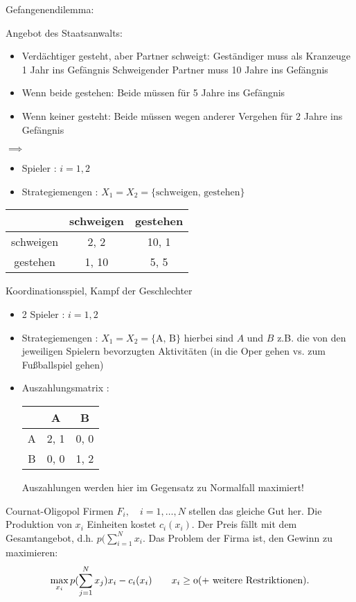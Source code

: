 \begin{beispiel}
	Gefangenendilemma:

	Angebot des Staatsanwalts:
	\begin{itemize}
		\item Verdächtiger gesteht, aber Partner schweigt:
			Geständiger muss als Kranzeuge 1 Jahr ins Gefängnis
			Schweigender Partner muss 10 Jahre ins Gefängnis
		\item Wenn beide gestehen: Beide müssen für 5 Jahre ins Gefängnis
		\item Wenn keiner gesteht: Beide müssen wegen anderer Vergehen für 2 Jahre ins Gefängnis
	\end{itemize}
	$\implies$
	\begin{itemize}
		\item Spieler : $i=1, 2$
		\item Strategiemengen : $X_1 = X_2 = \{\text{schweigen, gestehen}\}$
	\end{itemize}
	\begin{tabular}{c|c|c}
		&schweigen&gestehen \\ \hline
		schweigen & 2, 2& 10, 1 \\ \hline
		gestehen & 1, 10& 5, 5
	\end{tabular}
\end{beispiel}

\begin{beispiel}
	Koordinationsspiel, Kampf der Geschlechter
	\begin{itemize}
		\item 2 Spieler : $i = 1, 2$
		\item Strategiemengen : $X_1 = X_2 = \{\text{A, B}\}$
			hierbei sind $A$ und $B$ z.B. die von den jeweiligen Spielern bevorzugten Aktivitäten (in die Oper gehen vs. zum Fußballspiel gehen)
		\item Auszahlungsmatrix :
			\begin{tabular}{c|c|c}
				&A&B \\ \hline
				A& 2, 1& 0, 0 \\ \hline
				B& 0, 0& 1, 2 
			\end{tabular}
			Auszahlungen werden hier im Gegensatz zu Normalfall maximiert!
	\end{itemize}
\end{beispiel}

\begin{beispiel}
	Cournat-Oligopol
	Firmen $F_i, \quad i=1,\ldots,N$ stellen das gleiche Gut her. Die Produktion von $x_i$ Einheiten kostet $c_i(x_i)$. Der Preis fällt mit dem Gesamtangebot, d.h. $p(\sum_{i=1}^{N} x_i$.
	Das Problem der Firma ist, den Gewinn zu maximieren:
	\[
		\max_{x_i} p(\sum_{j=1}^N x_j)x_i - c_i(x_i) \qquad \mit x_i \geq 0 \text{(+ weitere Restriktionen)}
	.\] 
\end{beispiel}


